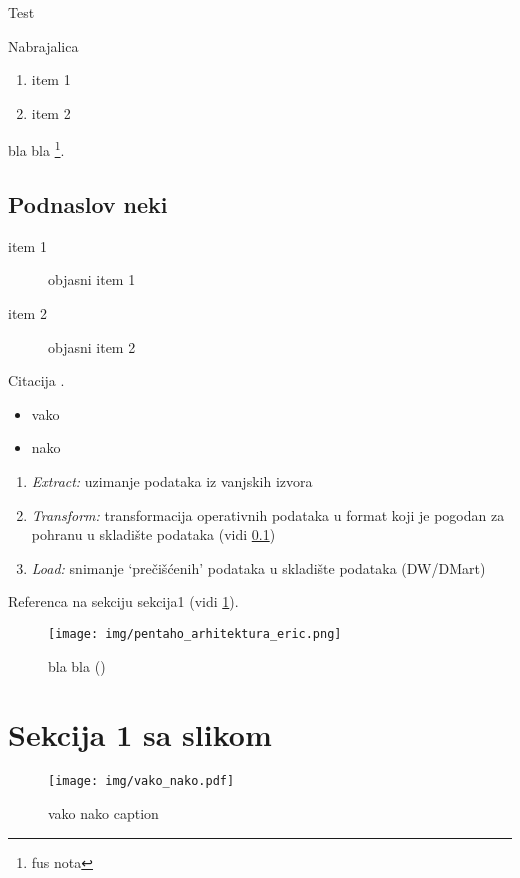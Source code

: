 \documentclass[times, utf8, seminar]{fit}
\begin{document}
Test

Nabrajalica

\begin{enumerate}
  \item item 1
  \item item 2
\end{enumerate}

bla bla \footnote{fus nota}.

\subsection{Podnaslov neki}

\label{labela_oznaka}

\begin{description}
  \item [item 1]  objasni item 1
  \item [item 2] objasni item 2
\end{description}
 

Citacija \cite[str.~391]{pentaho32}.

\begin{itemize}
   \item vako 
   \item nako
\end{itemize}

\begin{enumerate}
  \item \emph{Extract:}  uzimanje podataka iz vanjskih izvora
  \item \emph{Transform:} transformacija operativnih podataka u format koji je pogodan za pohranu u skladište podataka (vidi \ref{labela_oznaka})
  \item \emph{Load:} snimanje `prečišćenih' podataka u skladište podataka (DW/DMart)
\end{enumerate}
 

Referenca na sekciju sekcija1 (vidi \ref{sect:sekcija1}).

 
\begin{figure}[H]
\centering
\texttt{[image: img/pentaho\_arhitektura\_eric.png]}
\caption{bla bla (\cite{web:eric})}
\end{figure}

\section{Sekcija 1 sa slikom}
\label{sect:sekcija1}

\begin{figure}[H]
\centering
\texttt{[image: img/vako\_nako.pdf]}
\caption{vako nako caption}
\end{figure}
\end{document}
